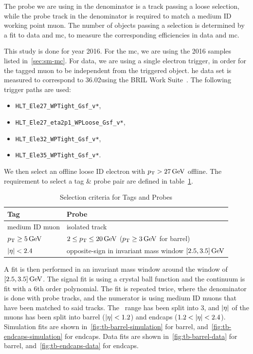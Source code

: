 The probe we are using in the denominator is a track passing a loose selection, while the probe track in the denominator is required to match a medium ID working point muon. The number of objects passing a selection is determined by a fit to data and \gls{mc}, to measure the corresponding efficiencies in data and \gls{mc}.

This study is done for year 2016. For the \gls{mc}, we are using the 2016 samples listed in~\ref{sec:sm-mc}. For data, we are  using a single electron trigger, in order for the tagged muon to be independent from the triggered object. he data set is measured to correspond to 36.02\fbinv using the BRIL Work Suite~\cite{bril}. The following trigger paths are used:

\begin{itemize}
\item \texttt{HLT\_Ele27\_WPTight\_Gsf\_v*},
\item \texttt{HLT\_Ele27\_eta2p1\_WPLoose\_Gsf\_v*},
\item \texttt{HLT\_Ele32\_WPTight\_Gsf\_v*},
\item \texttt{HLT\_Ele35\_WPTight\_Gsf\_v*}.
\end{itemize}

We then select an offline loose ID electron with $p_{\mathrm{T}}>27\,\text{Ge\hspace{-.08em}V}$ offline. The requirement to select a tag \& probe pair are defined in table~\ref{tab:tag-probe-def}.

\begin{table}[!htb]
	\centering
	\label{tab:tag-probe-def}
		\caption{Selection criteria for Tags and Probes}
			\begin{tabular}{l|l} \hline
			Tag & Probe \\ \hline
			medium ID muon & isolated track\\
			$p_{\mathrm{T}} \geq 5\,\text{Ge\hspace{-.08em}V}$ & $2\leq p_{\mathrm{T}}\leq 20\,\text{Ge\hspace{-.08em}V}$  ($ p_{\mathrm{T}}\geq 3 \,\text{Ge\hspace{-.08em}V} $ for barrel) \\
			$\lvert \eta \rvert<2.4$ & opposite-sign in invariant mass window $[2.5,3.5]\,\text{Ge\hspace{-.08em}V}$ \\ \hline
			\end{tabular}
\end{table}

A fit is then performed in an invariant mass window around the \JPsi window of $[2.5,3.5]\,\text{Ge\hspace{-.08em}V}$. The signal fit is using a crystal ball function and the continuum is fit with a 6th order polynomial. The fit is repeated twice, where the denominator is done with probe tracks, and the numerator is using medium ID muons that have been matched to said tracks. The \DR~range has been split into 3, and $\lvert \eta \rvert$ of the muons has been split into barrel ($\lvert \eta \rvert<1.2$) and endcaps ($1.2<\lvert \eta \rvert<2.4$). Simulation fits are shown in~\ref{fig:tb-barrel-simulation} for barrel, and~\ref{fig:tb-endcaps-simulation} for endcaps. Data fits are shown in~\ref{fig:tb-barrel-data} for barrel, and~\ref{fig:tb-endcaps-data} for endcaps.

